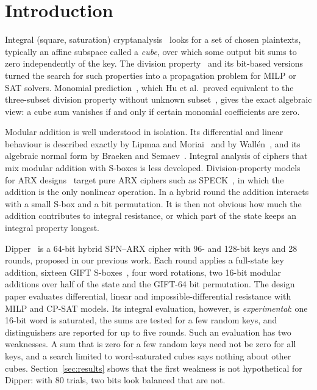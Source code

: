 \documentclass[pdflatex,sn-mathphys-num]{sn-jnl}
\theoremstyle{thmstyleone}
\theoremstyle{thmstylethree}
\theoremstyle{thmstyletwo}
\begin{document}
\maketitle



\section{Introduction}

Integral (square, saturation) cryptanalysis~\cite{knudsen2002integral} looks for a set of chosen plaintexts, typically an affine subspace called a \emph{cube}, over which some output bit sums to zero independently of the key. The division property~\cite{todo2015} and its bit-based versions~\cite{todo2016bit,xiang2016milp} turned the search for such properties into a propagation problem for MILP or SAT solvers. Monomial prediction~\cite{hu2020mp}, which Hu et al.\ proved equivalent to the three-subset division property without unknown subset~\cite{hao2020}, gives the exact algebraic view: a cube sum vanishes if and only if certain monomial coefficients are zero.

Modular addition is well understood in isolation. Its differential and linear behaviour is described exactly by Lipmaa and Moriai~\cite{lipmaa2001} and by Wallén~\cite{wallen2003}, and its algebraic normal form by Braeken and Semaev~\cite{braeken2005}. Integral analysis of ciphers that mix modular addition with S-boxes is less developed. Division-property models for ARX designs~\cite{sun2016arx,sun2017sat} target pure ARX ciphers such as SPECK~\cite{simonspeck2015}, in which the addition is the only nonlinear operation. In a hybrid round the addition interacts with a small S-box and a bit permutation. It is then not obvious how much the addition contributes to integral resistance, or which part of the state keeps an integral property longest.

Dipper~\cite{dipper2026} is a 64-bit hybrid SPN--ARX cipher with 96- and 128-bit keys and 28 rounds, proposed in our previous work. Each round applies a full-state key addition, sixteen GIFT S-boxes~\cite{gift2017}, four word rotations, two 16-bit modular additions over half of the state and the GIFT-64 bit permutation. The design paper evaluates differential, linear and impossible-differential resistance with MILP and CP-SAT models. Its integral evaluation, however, is \emph{experimental}: one 16-bit word is saturated, the sums are tested for a few random keys, and distinguishers are reported for up to five rounds. Such an evaluation has two weaknesses. A sum that is zero for a few random keys need not be zero for all keys, and a search limited to word-saturated cubes says nothing about other cubes. Section~\ref{sec:results} shows that the first weakness is not hypothetical for Dipper: with 80 trials, two bits look balanced that are not.
\end{document}
